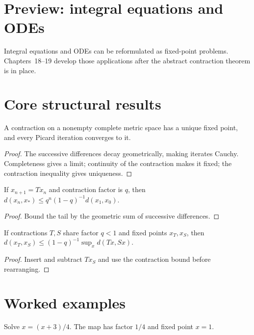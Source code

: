 \section{Preview: integral equations and ODEs}
Integral equations and ODEs can be reformulated as fixed-point problems. Chapters~18--19 develop those applications after the abstract contraction theorem is in place.

\section{Core structural results}

\begin{theorem}\label{thm:ii16-01}
A contraction on a nonempty complete metric space has a unique fixed point, and every Picard iteration converges to it.
\begin{proof}
The successive differences decay geometrically, making iterates Cauchy. Completeness gives a limit; continuity of the contraction makes it fixed; the contraction inequality gives uniqueness.
\end{proof}
\end{theorem}

\begin{theorem}\label{thm:ii16-02}
If $x_{n+1}=Tx_n$ and contraction factor is $q$, then $d(x_n,x_*)\le q^n(1-q)^{-1}d(x_1,x_0)$.
\begin{proof}
Bound the tail by the geometric sum of successive differences.
\end{proof}
\end{theorem}

\begin{theorem}\label{thm:ii16-03}
If contractions $T,S$ share factor $q<1$ and fixed points $x_T,x_S$, then $d(x_T,x_S)\le(1-q)^{-1}\sup_x d(Tx,Sx)$.
\begin{proof}
Insert and subtract $Tx_S$ and use the contraction bound before rearranging.
\end{proof}
\end{theorem}

\section{Worked examples}

\begin{example}\label{ex:ii16-worked-01}
Solve $x=(x+3)/4$. The map has factor $1/4$ and fixed point $x=1$.
\end{example}

